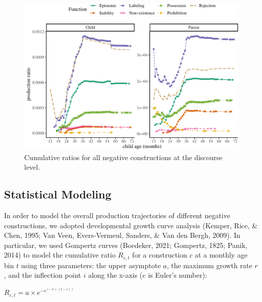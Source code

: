 \documentclass[
  man,floatsintext]{apa6}
\begin{document}
\begin{figure}[H]

{\centering \includegraphics{neg_construction_article_files/figure-latex/alldiscourse-1} 

}

\caption{Cumulative ratios for all negative constructions at the discourse level.}\label{fig:alldiscourse}
\end{figure}

\hypertarget{statistical-modeling}{%
\subsection{Statistical Modeling}\label{statistical-modeling}}

In order to model the overall production trajectories of different negative constructions, we adopted developmental growth curve analysis (Kemper, Rice, \& Chen, 1995; Van Veen, Evers-Vermeul, Sanders, \& Van den Bergh, 2009). In particular, we used Gompertz curves (Boedeker, 2021; Gompertz, 1825; Panik, 2014) to model the cumulative ratio \(R_{c,t}\) for a construction \(c\) at a monthly age bin \(t\) using three parameters: the upper asymptote \(a\), the maximum growth rate \(r\), and the inflection point \(i\) along the x-axis (\(e\) is Euler's number):

\(R_{c, t} = a \times e^{-e^{(-r \times (t - i))}}\)
\end{document}

